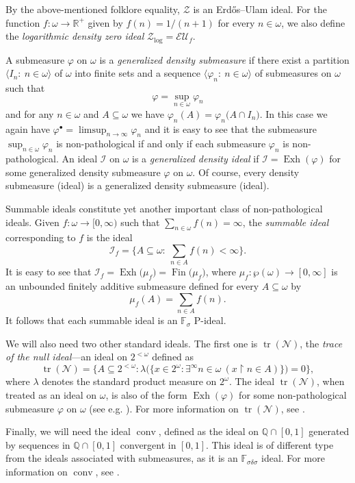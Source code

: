 \documentclass[a4paper,11pt,fleqn]{amsart}
\theoremstyle{definition}
\theoremstyle{remark}
\numberwithin{equation}{section}
\newcommand{\N}{\mathbb{N}}
\newcommand{\R}{\mathbb{R}}
\newcommand{\Q}{\mathbb{Q}}
\newcommand{\F}{\mathbb{F}}
\newcommand{\iI}{\mathcal{I}}
\newcommand{\nN}{\mathcal{N}}
\newcommand{\zZ}{\mathcal{Z}}
\DeclareMathOperator{\conv}{{conv}}
\DeclareMathOperator{\exh}{Exh}
\DeclareMathOperator{\fin}{Fin}
\newcommand{\sub}{\subseteq}
\newcommand{\seqn}[1]{\big\langle#1\colon\ n\io\big\rangle}
\newcommand{\io}{\in\omega}%
\newcommand{\wo}{{\wp(\omega)}}%
\newcommand{\seqtwo}{2^{<\omega}}
\newcommand{\Cantor}{2^\omega}
\newcommand{\erdos}{{Erd\H{o}s}}
\DeclareMathOperator{\tr}{tr}
\begin{document}
By the above-mentioned folklore equality, $\zZ$ is an \erdos--Ulam ideal. For the function $f\colon\omega\to\R^+$ given by $f(n)=1/(n+1)$ for every $n\io$, we also define the \textit{logarithmic density zero ideal} $\zZ_{\log}=\mathcal{EU}_f$.

A submeasure $\varphi$ on $\omega$ is a \textit{generalized density submeasure} if there exist a partition $\seqn{I_n}$ of $\omega$ into finite sets and a sequence $\seqn{\varphi_n}$ of submeasures on $\omega$ such that 
\[\varphi=\sup_{n\io}\varphi_n\]
and for any $n\io$ and $A\sub\omega$ we have $\varphi_n(A)=\varphi_n\big(A\cap I_n\big)$. In this case we again have $\varphi^\bullet=\limsup_{n\to\infty}\varphi_n$ and it is easy to see that the submeasure $\sup_{n\in\omega}\varphi_n$ is non-pathological if and only if each submeasure $\varphi_n$ is non-pathological. An ideal $\iI$ on $\omega$ is a \textit{generalized density ideal} if
$\iI=\exh(\varphi)$ for some generalized density submeasure $\varphi$ on $\omega$. Of course, every density submeasure (ideal) is a generalized density submeasure (ideal).
 
\medskip

Summable ideals constitute yet another important class of non-pathological ideals. Given $f\colon\omega\to[0,\infty)$ such that $\sum_{n\io}f(n)=\infty$, the \textit{summable ideal} corresponding to $f$ is the ideal
\[\iI_f=\bigg\{A\sub\omega\colon\ \sum_{n\in A} f(n) < \infty\bigg\}.\]
It is easy to see that $\iI_f = \exh\big(\mu_f\big)=\fin\big(\mu_f\big)$, where $\mu_f\colon\wo\to[0,\infty]$ is an unbounded finitely additive submeasure defined for every $A\sub\omega$ by
\[ \mu_f (A) = \sum_{n\in A} f(n).\]
It follows that each summable ideal is an $\F_\sigma$ P-ideal.

\medskip

We will also need two other standard ideals. The first one is $\tr(\nN)$, the \textit{trace of the null ideal}---an ideal on $\seqtwo$ defined as
\[\tr(\nN)= \Big\{A\sub\seqtwo\colon \lambda\big(\big\{x\in\Cantor\colon \exists^\infty n\in\omega \:
(x\restriction n \in A)\big\}\big)=0 \Big\},\]
where $\lambda$ denotes the standard product measure on $\Cantor$. The ideal $\tr(\nN)$, when treated as an ideal on $\omega$, is also of the form $\exh(\varphi)$ for some non-pathological submeasure $\varphi$ on $\omega$ (see e.g. \cite[page 1272]{BNFP15}). For more information on $\tr(\nN)$, see \cite{HHH07}.

Finally, we will need the ideal $\conv$, defined as the ideal on $\Q\cap [0, 1]$ generated by sequences in $\Q\cap [0, 1]$ convergent in $[0, 1]$. This ideal is of different type from the ideals associated with submeasures, as it is an $\F_{\sigma\delta\sigma}$ ideal. For more information on $\conv$, see \cite{Hru17}.
\end{document}

